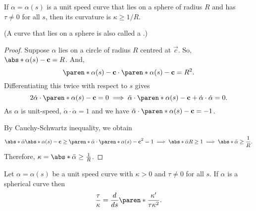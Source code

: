 \documentclass[11pt]{penrose}
\begin{document}
\begin{nthm}
    If $\alpha = \alpha(s)$ is a unit speed curve that lies on a sphere of radius $R$ and has $\tau \neq 0$ for all $s$, then its curvature is $\kappa \geq 1/R$.
\end{nthm}
(A curve that lies on a sphere is also called a .)
\begin{proof}
    Suppose $\alpha$ lies on a circle of radius $R$ centred at $\vec{c}$. So, $\abs*{\alpha(s) - \vec{c}} = R$. And,
    \begin{equation}
        \paren*{\alpha(s) - \vec{c}} \cdot \paren*{\alpha(s) - \vec{c}} = R^2.
    \end{equation}
    Differentiating this twice with respect to $s$ gives
    \begin{equation}
        2 \dot{\alpha} \cdot \paren*{\alpha(s) - \vec{c}} = 0
        \implies
        \ddot{\alpha} \cdot \paren*{\alpha(s) - \vec{c}} + \dot{\alpha} \cdot \dot{\alpha} = 0.
    \end{equation}
    As $\alpha$ is unit-speed, $\dot{\alpha} \cdot \dot{\alpha} = 1$ and we have $\ddot{\alpha} \cdot \paren*{\alpha(s) - \vec{c}} = -1$.

    By Cauchy-Schwartz inequality, we obtain
    \begin{equation}
        \abs*{\ddot{\alpha}} \abs*{\alpha(s) - \vec{c}}
        \geq \paren*{ \ddot{\alpha} \cdot \paren*{\alpha(s) - \vec{c}} }^2
        = 1
        \implies
        \abs*{\ddot{\alpha}} R
        \geq 1
        \implies
        \abs*{\ddot{\alpha}} \geq \frac{1}{R}.
    \end{equation}
    Therefore, $\kappa = \abs*{\ddot{\alpha}} \geq \frac{1}{R}$.
\end{proof}

\begin{nthm}
    Let $\alpha = \alpha(s)$ be a unit speed curve with $\kappa > 0$ and $\tau \neq 0$ for all $s$. If $\alpha$ is a spherical curve then
    \begin{equation}
        \frac{\tau}{\kappa} = \frac{d}{ds}\paren*{\frac{\kappa'}{\tau \kappa^2}}.
    \end{equation}
\end{nthm}
\end{document}
